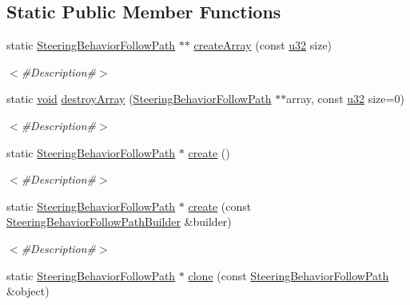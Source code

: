 \subsection*{Static Public Member Functions}
\begin{DoxyCompactItemize}
\item 
static \mbox{\hyperlink{classnjli_1_1_steering_behavior_follow_path}{Steering\+Behavior\+Follow\+Path}} $\ast$$\ast$ \mbox{\hyperlink{classnjli_1_1_steering_behavior_follow_path_ab66eee2d77b84ff0bd458b2152c36ebf}{create\+Array}} (const \mbox{\hyperlink{_util_8h_a10e94b422ef0c20dcdec20d31a1f5049}{u32}} size)
\begin{DoxyCompactList}\small\item\em $<$\#\+Description\#$>$ \end{DoxyCompactList}\item 
static \mbox{\hyperlink{_thread_8h_af1e856da2e658414cb2456cb6f7ebc66}{void}} \mbox{\hyperlink{classnjli_1_1_steering_behavior_follow_path_a257506416f98a717aaee51eb4e8450fe}{destroy\+Array}} (\mbox{\hyperlink{classnjli_1_1_steering_behavior_follow_path}{Steering\+Behavior\+Follow\+Path}} $\ast$$\ast$array, const \mbox{\hyperlink{_util_8h_a10e94b422ef0c20dcdec20d31a1f5049}{u32}} size=0)
\begin{DoxyCompactList}\small\item\em $<$\#\+Description\#$>$ \end{DoxyCompactList}\item 
static \mbox{\hyperlink{classnjli_1_1_steering_behavior_follow_path}{Steering\+Behavior\+Follow\+Path}} $\ast$ \mbox{\hyperlink{classnjli_1_1_steering_behavior_follow_path_a28a4e4320e7fe35dd1f5b8142884617b}{create}} ()
\begin{DoxyCompactList}\small\item\em $<$\#\+Description\#$>$ \end{DoxyCompactList}\item 
static \mbox{\hyperlink{classnjli_1_1_steering_behavior_follow_path}{Steering\+Behavior\+Follow\+Path}} $\ast$ \mbox{\hyperlink{classnjli_1_1_steering_behavior_follow_path_ab971d2cd578ee87af6e863369fd4efa8}{create}} (const \mbox{\hyperlink{classnjli_1_1_steering_behavior_follow_path_builder}{Steering\+Behavior\+Follow\+Path\+Builder}} \&builder)
\begin{DoxyCompactList}\small\item\em $<$\#\+Description\#$>$ \end{DoxyCompactList}\item 
static \mbox{\hyperlink{classnjli_1_1_steering_behavior_follow_path}{Steering\+Behavior\+Follow\+Path}} $\ast$ \mbox{\hyperlink{classnjli_1_1_steering_behavior_follow_path_afb1d08e0c6eba6d0096a0b021e58e0ed}{clone}} (const \mbox{\hyperlink{classnjli_1_1_steering_behavior_follow_path}{Steering\+Behavior\+Follow\+Path}} \&object)

\end{DoxyCompactItemize}
